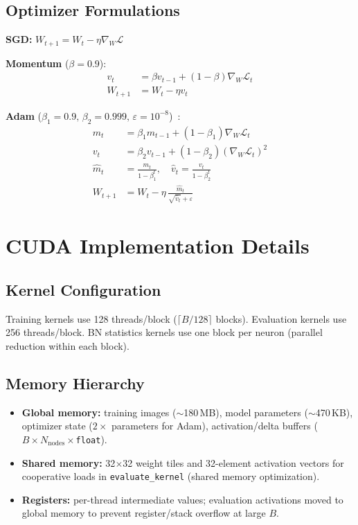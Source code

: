 \documentclass[conference]{IEEEtran}
\begin{document}
\subsection{Optimizer Formulations}

\textbf{SGD:} $W_{t+1} = W_t - \eta \nabla_W \mathcal{L}$

\textbf{Momentum} ($\beta=0.9$):
\begin{align}
v_t &= \beta v_{t-1} + (1-\beta)\nabla_W \mathcal{L}_t \\
W_{t+1} &= W_t - \eta v_t
\end{align}

\textbf{Adam} ($\beta_1=0.9,\,\beta_2=0.999,\,\varepsilon=10^{-8}$)~\cite{b7}:
\begin{align}
m_t &= \beta_1 m_{t-1} + (1-\beta_1)\nabla_W \mathcal{L}_t \\
v_t &= \beta_2 v_{t-1} + (1-\beta_2)(\nabla_W \mathcal{L}_t)^2 \\
\hat{m}_t &= \frac{m_t}{1-\beta_1^t},\quad \hat{v}_t = \frac{v_t}{1-\beta_2^t} \\
W_{t+1} &= W_t - \eta\,\frac{\hat{m}_t}{\sqrt{\hat{v}_t}+\varepsilon}
\end{align}

\section{CUDA Implementation Details}

\subsection{Kernel Configuration}

Training kernels use 128 threads/block ($\lceil B/128 \rceil$ blocks). Evaluation kernels use 256 threads/block. BN statistics kernels use one block per neuron (parallel reduction within each block).

\subsection{Memory Hierarchy}

\begin{itemize}
  \item \textbf{Global memory:} training images ($\sim$180\,MB), model parameters ($\sim$470\,KB), optimizer state ($2\times$ parameters for Adam), activation/delta buffers ($B \times N_\text{nodes} \times$\texttt{float}).
  \item \textbf{Shared memory:} 32$\times$32 weight tiles and 32-element activation vectors for cooperative loads in \texttt{evaluate\_kernel} (shared memory optimization).
  \item \textbf{Registers:} per-thread intermediate values; evaluation activations moved to global memory to prevent register/stack overflow at large $B$.
\end{itemize}
\end{document}
